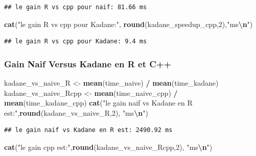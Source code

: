 \documentclass[
]{article}
\newenvironment{Shaded}{\begin{snugshade}}{\end{snugshade}}
\newcommand{\DecValTok}[1]{\textcolor[rgb]{0.00,0.00,0.81}{#1}}
\newcommand{\FunctionTok}[1]{\textcolor[rgb]{0.13,0.29,0.53}{\textbf{#1}}}
\newcommand{\NormalTok}[1]{#1}
\newcommand{\OtherTok}[1]{\textcolor[rgb]{0.56,0.35,0.01}{#1}}
\newcommand{\SpecialCharTok}[1]{\textcolor[rgb]{0.81,0.36,0.00}{\textbf{#1}}}
\newcommand{\StringTok}[1]{\textcolor[rgb]{0.31,0.60,0.02}{#1}}
\begin{document}
\begin{verbatim}
## le gain R vs cpp pour naif: 81.66 ms
\end{verbatim}

\begin{Shaded}
\begin{Highlighting}[]
\FunctionTok{cat}\NormalTok{(}\StringTok{"le gain R vs cpp pour Kadane:"}\NormalTok{, }\FunctionTok{round}\NormalTok{(kadane\_speedup\_cpp,}\DecValTok{2}\NormalTok{),}\StringTok{"ms}\SpecialCharTok{\textbackslash{}n}\StringTok{"}\NormalTok{)}
\end{Highlighting}
\end{Shaded}

\begin{verbatim}
## le gain R vs cpp pour Kadane: 9.4 ms
\end{verbatim}

\subsubsection{Gain Naif Versus Kadane en R et
C++}\label{gain-naif-versus-kadane-en-r-et-c}

\begin{Shaded}
\begin{Highlighting}[]
\NormalTok{kadane\_vs\_naive\_R }\OtherTok{\textless{}{-}} \FunctionTok{mean}\NormalTok{(time\_naive) }\SpecialCharTok{/} \FunctionTok{mean}\NormalTok{(time\_kadane)}
\NormalTok{kadane\_vs\_naive\_Rcpp }\OtherTok{\textless{}{-}} \FunctionTok{mean}\NormalTok{(time\_naive\_cpp) }\SpecialCharTok{/} \FunctionTok{mean}\NormalTok{(time\_kadane\_cpp)}
\FunctionTok{cat}\NormalTok{(}\StringTok{"le gain naif vs Kadane en R est:"}\NormalTok{,}\FunctionTok{round}\NormalTok{(kadane\_vs\_naive\_R,}\DecValTok{2}\NormalTok{), }\StringTok{"ms}\SpecialCharTok{\textbackslash{}n}\StringTok{"}\NormalTok{)}
\end{Highlighting}
\end{Shaded}

\begin{verbatim}
## le gain naif vs Kadane en R est: 2490.92 ms
\end{verbatim}

\begin{Shaded}
\begin{Highlighting}[]
\FunctionTok{cat}\NormalTok{(}\StringTok{"le gain cpp est:"}\NormalTok{,}\FunctionTok{round}\NormalTok{(kadane\_vs\_naive\_Rcpp,}\DecValTok{2}\NormalTok{), }\StringTok{"ms}\SpecialCharTok{\textbackslash{}n}\StringTok{"}\NormalTok{)}
\end{Highlighting}
\end{Shaded}
\end{document}

